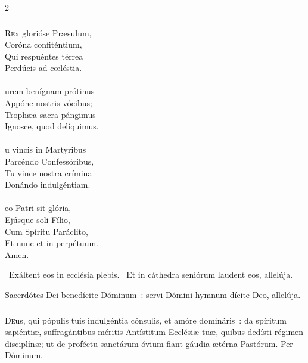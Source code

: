 \documentclass[9pt,twoside]{extarticle}
\begin{document}
\begin{multicols}{2}
\subsubsection*{\center {}}
\lettrine{R}ex glorióse Præsulum,\\
Coróna confiténtium,\\
Qui respuéntes térrea\\
Perdúcis ad cœléstia.\\
\\
urem benígnam prótinus\\
Appóne nostris vócibus;\\
Trophæa sacra pángimus\\
Ignosce, quod delíquimus.\\
\\
u vincis in Martyribus\\
Parcéndo Confessóribus,\\
Tu vince nostra crímina\\
Donándo indulgéntiam.\\
\\
eo Patri sit glória,\\
Ejúsque soli Fílio,\\
Cum Spíritu Paráclito,\\
Et nunc et in perpétuum.\\
Amen.

\begin{tightlist}{}
\item {}~Exáltent eos in ecclésia plebis. ~Et in cáthedra seniórum laudent eos, allelúja.
\item {} Sacerdótes Dei benedícite Dóminum~: servi Dómini hymnum dícite Deo, allelúja.
\end{tightlist}

\subsubsection*{\center {}}
\lettrine{D}eus, qui pópulis tuis indulgéntia cónsulis, et amóre domináris~: da spíritum sapiéntiæ, suffragántibus méritis Antístitum Ecclésiæ tuæ, quibus dedísti régimen disciplínæ; ut de proféctu sanctárum óvium fiant gáudia ætérna Pastórum. Per Dóminum.

\begin{tightlist}{}
\item {}
\end{tightlist}


\end{multicols}
\end{document}
